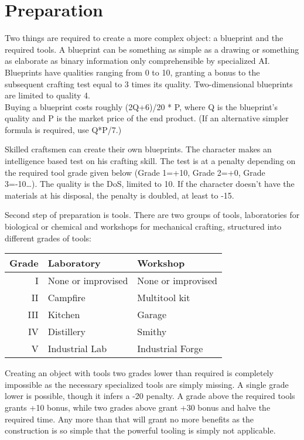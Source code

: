 \documentclass[12pt,a4paper,openany]{book}
\begin{document}
	\chapter{Preparation}
	Two things are required to create a more complex object: a blueprint and the required tools.
	A blueprint can be something as simple as a drawing or something as elaborate as binary information only comprehensible by specialized AI. Blueprints have qualities ranging from 0 to 10, granting a bonus to the subsequent crafting test equal to 3 times its quality. Two-dimensional blueprints are limited to quality 4.\\
	Buying a blueprint costs roughly (2Q+6)/20 * P, where Q is the blueprint’s quality and P is the market price of the end product. (If an alternative simpler formula is required, use Q*P/7.)\par
	Skilled craftsmen can create their own blueprints. The character makes an intelligence based test on his crafting skill. The test is at a penalty depending on the required tool grade given below (Grade 1=+10, Grade 2=+0, Grade 3=-10…). The quality is the DoS, limited to 10. If the character doesn’t have the materials at his disposal, the penalty is doubled, at least to -15.\par
	\newpage %
	Second step of preparation is tools. There are two groups of tools, laboratories for biological or chemical and workshops for mechanical crafting, structured into different grades of tools:
	\par
	\begin{tabularx}{\columnwidth}{r|XX}
		Grade & Laboratory & Workshop \\
		\hline
		I & None or improvised & None or improvised \\
		II & Campfire & Multitool kit \\
		III & Kitchen & Garage \\
		IV & Distillery & Smithy \\
		V & Industrial Lab & Industrial Forge
	\end{tabularx}
	\par
	Creating an object with tools two grades lower than required is completely impossible as the necessary specialized tools are simply missing. A single grade lower is possible, though it infers a -20 penalty. A grade above the required tools grants +10 bonus, while two grades above grant +30 bonus and halve the required time. Any more than that will grant no more benefits as the construction is so simple that the powerful tooling is simply not applicable.\\
\end{document}
